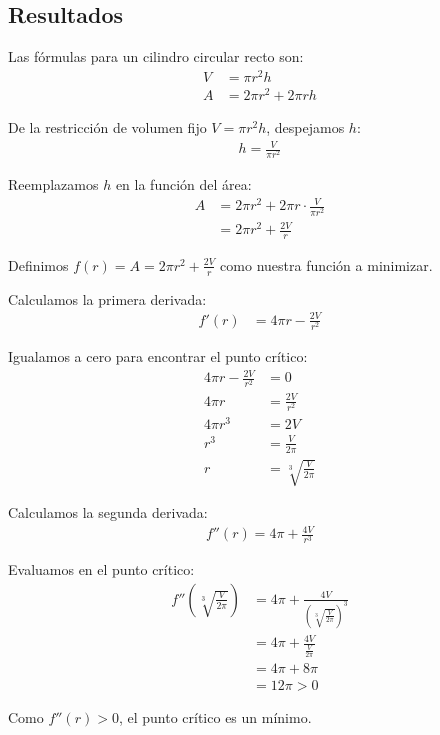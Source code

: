 \documentclass{article}
\begin{document}
\subsection{Resultados}
\setcounter{equation}{0}

Las fórmulas para un cilindro circular recto son:
\begin{align}
V &= \pi r^2 h \\
A &= 2\pi r^2 + 2\pi rh
\end{align}

De la restricción de volumen fijo $V = \pi r^2 h$, despejamos $h$:
\begin{align}
h = \frac{V}{\pi r^2}
\end{align}

Reemplazamos $h$ en la función del área:
\begin{align}
A &= 2\pi r^2 + 2\pi r \cdot \frac{V}{\pi r^2} \\
&= 2\pi r^2 + \frac{2V}{r}
\end{align}

Definimos $f(r) = A = 2\pi r^2 + \frac{2V}{r}$ como nuestra función a minimizar.

Calculamos la primera derivada:
\begin{align}
f'(r) &= 4\pi r - \frac{2V}{r^2}
\end{align}

Igualamos a cero para encontrar el punto crítico:
\begin{align}
4\pi r - \frac{2V}{r^2} &= 0 \\
4\pi r &= \frac{2V}{r^2} \\
4\pi r^3 &= 2V \\
r^3 &= \frac{V}{2\pi} \\
r &= \sqrt[3]{\frac{V}{2\pi}}
\end{align}

Calculamos la segunda derivada:
\begin{align}
f''(r) = 4\pi + \frac{4V}{r^3}
\end{align}

Evaluamos en el punto crítico:
\begin{align}
f''\left(\sqrt[3]{\frac{V}{2\pi}}\right) &= 4\pi + \frac{4V}{\left(\sqrt[3]{\frac{V}{2\pi}}\right)^3} \\
&= 4\pi + \frac{4V}{\frac{V}{2\pi}} \\
&= 4\pi + 8\pi \\
&= 12\pi > 0
\end{align}

Como $f''(r) > 0$, el punto crítico es un mínimo.
\end{document}
